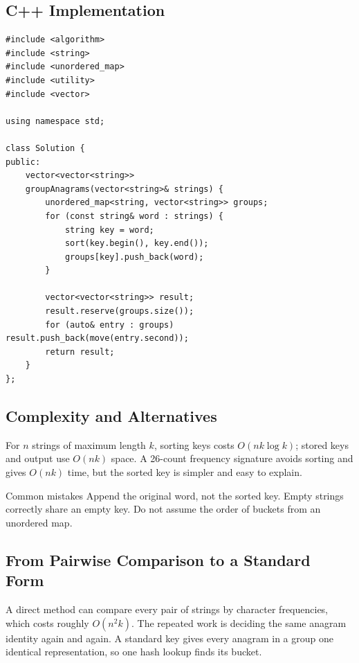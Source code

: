 \subsection{C++ Implementation}
\begin{lstlisting}[style=compactcode,caption={Complete C++ solution: Group Anagrams}]
#include <algorithm>
#include <string>
#include <unordered_map>
#include <utility>
#include <vector>

using namespace std;

class Solution {
public:
    vector<vector<string>>
    groupAnagrams(vector<string>& strings) {
        unordered_map<string, vector<string>> groups;
        for (const string& word : strings) {
            string key = word;
            sort(key.begin(), key.end());
            groups[key].push_back(word);
        }

        vector<vector<string>> result;
        result.reserve(groups.size());
        for (auto& entry : groups) result.push_back(move(entry.second));
        return result;
    }
};
\end{lstlisting}

\subsection{Complexity and Alternatives}
For \(n\) strings of maximum length \(k\), sorting keys costs
\(O(nk\log k)\); stored keys and output use \(O(nk)\) space. A 26-count
frequency signature avoids sorting and gives \(O(nk)\) time, but the sorted
key is simpler and easy to explain.

\begin{revisionbox}{Common mistakes}
Append the original word, not the sorted key. Empty strings correctly share an
empty key. Do not assume the order of buckets from an unordered map.
\end{revisionbox}

\subsection{From Pairwise Comparison to a Standard Form}
A direct method can compare every pair of strings by character frequencies,
which costs roughly \(O(n^2k)\). The repeated work is deciding the same
anagram identity again and again. A standard key gives every anagram in a
group one identical representation, so one hash lookup finds its bucket.


